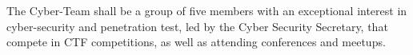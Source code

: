  The Cyber-Team shall be a group of five members with an exceptional interest in cyber-security and penetration test, led by the Cyber Security Secretary, that compete in CTF competitions, as well as attending conferences and meetups. \\ 
